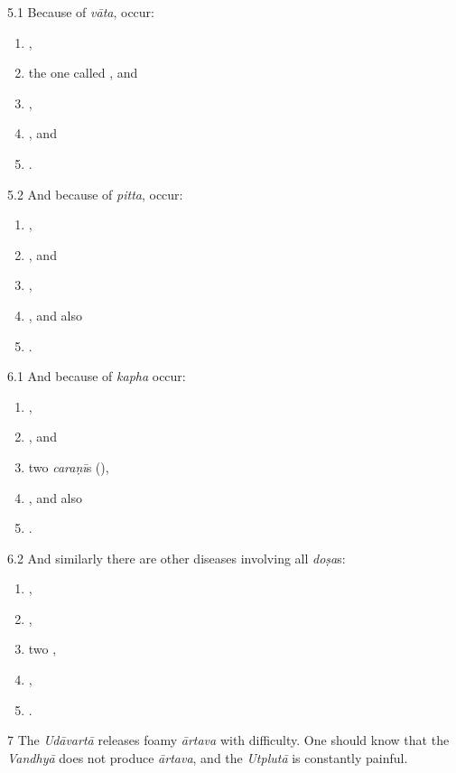 \begin{translation}
\item [5.1] Because of \emph{vāta}, occur:
	\begin{enumerate}
		\item {},
		\item the one called , and
		\item {},
		\item {}, and
		\item {}.
	\end{enumerate}
\item [5.2] And because of \emph{pitta}, occur:
	\begin{enumerate}
		\item {},
		\item {}, and
		\item {},
		\item {}, and also
		\item {}.
	\end{enumerate}


\item [6.1] And because of \emph{kapha} occur:
	\begin{enumerate}
		\item {},
		\item {}, and
		\item two \emph{caraṇī}s (),
		\item {}, and also
		\item {}.
	\end{enumerate}

\item [6.2] And similarly there are other diseases involving all \emph{doṣa}s:
	\begin{enumerate}
		\item {},
		\item {},
		\item two ,
		\item {},
		\item {}.
	\end{enumerate}

\item [7] The \emph{Udāvartā} releases foamy \emph{ārtava} with difficulty. 
One should know that the \emph{Vandhyā} does not produce \emph{ārtava}, and the \emph{Utplutā} is constantly painful. 


\end{translation}
